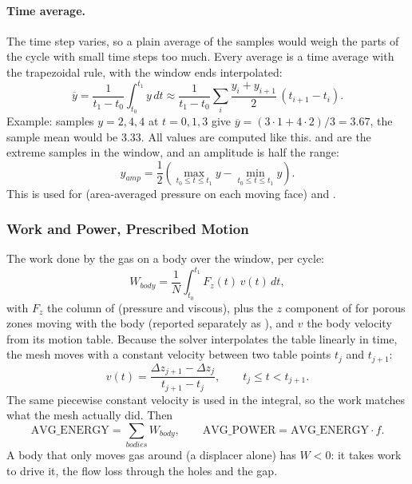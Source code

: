 \paragraph{Time average.}
The time step varies, so a plain average of the samples would weigh the parts of the cycle with small time steps too much. Every average is a time average with the trapezoidal rule, with the window ends interpolated:
\begin{equation}
\overline{y} = \frac{1}{t_1 - t_0}\int_{t_0}^{t_1} y\,dt \approx \frac{1}{t_1 - t_0}\sum_i \frac{y_i + y_{i+1}}{2}\,(t_{i+1} - t_i) .
\end{equation}
Example: samples $y = 2, 4, 4$ at $t = 0, 1, 3$ give $\overline{y} = (3 \cdot 1 + 4 \cdot 2)/3 = 3.67$, the sample mean would be 3.33. All  values are computed like this.  and  are the extreme samples in the window, and an amplitude is half the range:
\begin{equation}
y_{amp} = \frac{1}{2}\left(\max_{t_0 \le t \le t_1} y - \min_{t_0 \le t \le t_1} y\right) .
\end{equation}
This is used for  (area-averaged pressure on each moving face) and .

\subsubsection{Work and Power, Prescribed Motion}
The work done by the gas on a body over the window, per cycle:
\begin{equation}
W_{body} = \frac{1}{N}\int_{t_0}^{t_1} F_z(t)\, v(t)\, dt ,
\end{equation}
with $F_z$ the  column of  (pressure and viscous), plus the $z$ component of  for porous zones moving with the body (reported separately as ), and $v$ the body velocity from its motion table. Because the solver interpolates the table linearly in time, the mesh moves with a constant velocity between two table points $t_j$ and $t_{j+1}$:
\begin{equation}
v(t) = \frac{\Delta z_{j+1} - \Delta z_j}{t_{j+1} - t_j}, \qquad t_j \le t < t_{j+1} .
\end{equation}
The same piecewise constant velocity is used in the integral, so the work matches what the mesh actually did. Then
\begin{equation}
\mathrm{AVG\_ENERGY} = \sum_{bodies} W_{body}, \qquad \mathrm{AVG\_POWER} = \mathrm{AVG\_ENERGY}\cdot f .
\end{equation}
A body that only moves gas around (a displacer alone) has $W < 0$: it takes work to drive it, the flow loss through the holes and the gap.

